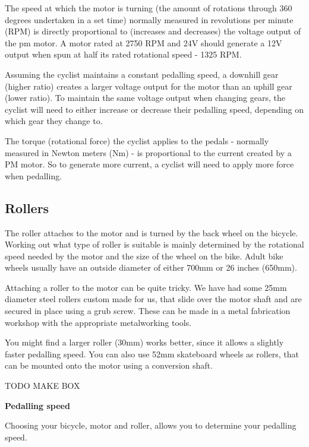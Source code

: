 \documentclass{article}
\theoremstyle{definition}
\theoremstyle{definition}
\theoremstyle{remark}
\begin{document}
    The speed at which the motor is turning (the amount of rotations through 360 degrees undertaken in a set time) normally measured in revolutions per minute (RPM) is directly proportional to (increases and decreases) the voltage output of the pm motor. A motor rated at 2750 RPM and 24V should generate a 12V output when spun at half its rated rotational speed - 1325 RPM.

    Assuming the cyclist maintains a constant pedalling speed, a downhill gear (higher ratio) creates a larger voltage output for the motor than an uphill gear (lower ratio). To maintain the same voltage output when changing gears, the cyclist will need to either increase or decrease their pedalling speed, depending on which gear they change to.

    The torque (rotational force) the cyclist applies to the pedals - normally measured in Newton meters (Nm) - is proportional to the current created by a PM motor. So to generate more current, a cyclist will need to apply more force when pedalling.
      

  \subsection{Rollers} %
  \label{sub:rollers}

    The roller attaches to the motor and is turned by the back wheel on the bicycle. Working out what type of roller is suitable is mainly determined by the rotational speed needed by the motor and the size of the wheel on the bike. Adult bike wheels usually have an outside diameter of either 700mm or 26 inches (650mm).

    Attaching a roller to the motor can be quite tricky. We have had some 25mm diameter steel rollers custom made for us, that slide over the motor shaft and are secured in place using a grub screw. These can be made in a metal fabrication workshop with the appropriate metalworking tools. 

    You might find a larger roller (30mm) works better, since it allows a slightly faster pedalling speed. You can also use 52mm skateboard wheels as rollers, that can be mounted onto the motor using a conversion shaft.

    TODO MAKE BOX

    \textbf{Pedalling speed}

    Choosing your bicycle, motor and roller, allows you to determine your pedalling speed. 
\end{document}
